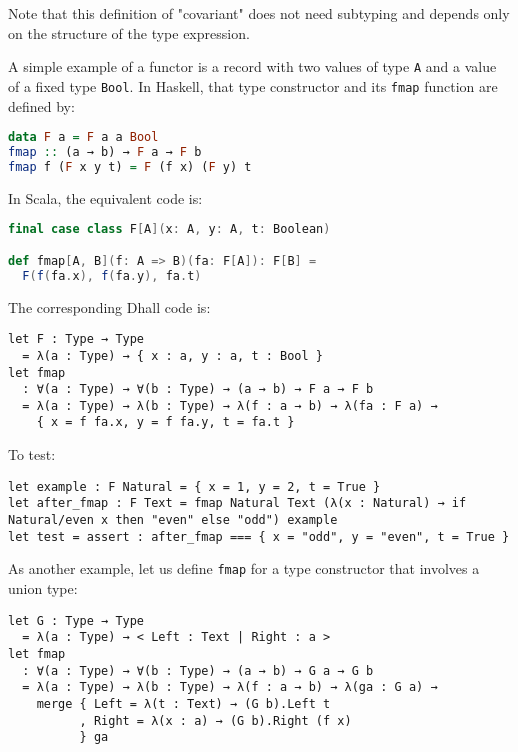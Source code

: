 Note that this definition of "covariant" does not need subtyping and depends only on the structure of the type expression.


A simple example of a functor is a record with two values of type \lstinline!A! and a value of a fixed type \lstinline!Bool!.
In Haskell, that type constructor and its \lstinline!fmap! function are defined by:


\begin{lstlisting}[language=Haskell]
data F a = F a a Bool
fmap :: (a → b) → F a → F b
fmap f (F x y t) = F (f x) (F y) t 
\end{lstlisting}


In Scala, the equivalent code is:


\begin{lstlisting}[language=Scala]
final case class F[A](x: A, y: A, t: Boolean)

def fmap[A, B](f: A => B)(fa: F[A]): F[B] =
  F(f(fa.x), f(fa.y), fa.t)
\end{lstlisting}


The corresponding Dhall code is:


\begin{lstlisting}[language=Dhall]
let F : Type → Type
  = λ(a : Type) → { x : a, y : a, t : Bool }
let fmap
  : ∀(a : Type) → ∀(b : Type) → (a → b) → F a → F b
  = λ(a : Type) → λ(b : Type) → λ(f : a → b) → λ(fa : F a) →
    { x = f fa.x, y = f fa.y, t = fa.t }
\end{lstlisting}


To test:


\begin{lstlisting}[language=Dhall]
let example : F Natural = { x = 1, y = 2, t = True }
let after_fmap : F Text = fmap Natural Text (λ(x : Natural) → if Natural/even x then "even" else "odd") example
let test = assert : after_fmap === { x = "odd", y = "even", t = True }
\end{lstlisting}


As another example, let us define \lstinline!fmap! for a type constructor that involves a union type:


\begin{lstlisting}[language=Dhall]
let G : Type → Type
  = λ(a : Type) → < Left : Text | Right : a >
let fmap
  : ∀(a : Type) → ∀(b : Type) → (a → b) → G a → G b
  = λ(a : Type) → λ(b : Type) → λ(f : a → b) → λ(ga : G a) →
    merge { Left = λ(t : Text) → (G b).Left t
          , Right = λ(x : a) → (G b).Right (f x)
          } ga
\end{lstlisting}


